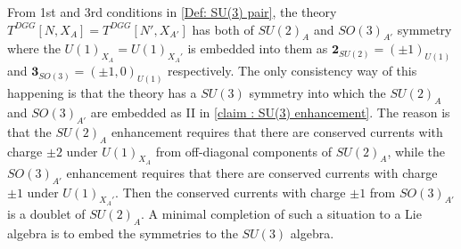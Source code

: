 \documentclass[a4paper,11pt]{article}
\begin{document}
From 1st and 3rd conditions in \eqref{Def: SU(3) pair}, the theory $T^{DGG}[N,X_A]=T^{DGG}[N',X_{A'}]$ has both of $SU(2)_A$ and $SO(3)_{A'}$ symmetry where the $U(1)_{X_A}=U(1)_{X_A'}$ is embedded into them as $\mathbf{2}_{SU(2)} = (\pm 1)_{U(1)}$ and $\mathbf{3}_{SO(3)} =(\pm 1, 0)_{U(1)}$ respectively. The  only  consistency way of this happening is that the theory has a $SU(3)$ symmetry into which the $SU(2)_A$ and $SO(3)_{A'}$ are embedded as  II in \eqref{claim : SU(3) enhancement}.
The reason is that the $SU(2)_A$ enhancement requires that there are conserved currents with charge $\pm 2$ under $U(1)_{X_A}$ from off-diagonal components of $SU(2)_A$,
while the $SO(3)_{A'}$ enhancement requires that there are conserved currents with charge $\pm 1$ under $U(1)_{X_A'}$.
Then the conserved currents with charge $\pm 1$ from $SO(3)_{A'}$ is a doublet of $SU(2)_A$. 
A minimal completion of such a situation to a Lie algebra is to embed the symmetries to the $SU(3)$ algebra.
\end{document}

